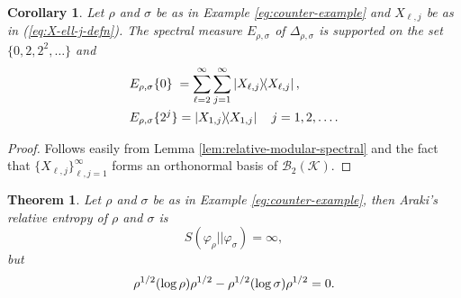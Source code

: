 \documentclass[12pt,a4paper,oneside]{article}
\numberwithin{equation}{section}
\theoremstyle{definition}  %
\theoremstyle{plain}  %
\newtheorem{thm}[defn]{Theorem}
\newtheorem{cor}[defn]{Corollary}
\theoremstyle{remark} %
\newcommand{\Bt}[1]{\mathscr{B}_2({#1})}
\newcommand{\CK}{\mathcal{K}}
\let\tr\relax
\DeclareMathOperator{\tr}{Tr}
\begin{document}
 \begin{cor} Let $\rho$ and $\sigma$ be as in Example \ref{eg:counter-example} and $X_{\ell,j}$ be as in (\ref{eq:X-ell-j-defn}).
The spectral measure $E_{\rho,\sigma}$ of $\Delta_{\rho,\sigma}$ is supported on the set $\{0,2,2^2,\dots\}$ and \begin{align}
    \label{eq:spectral-measure-relative-modular}
    &E_{\rho,\sigma}\{0\} \phantom{.}=\sum_{\ell=2}^\infty\sum_{j=1}^{\infty}\ketbra{X_{\ell,j}},\\
     &E_{\rho,\sigma}\{2^j\}  =\ketbra{X_{1,j}} \quad j=1,2,\dots.
\end{align}
 \end{cor}
 \begin{proof}
 Follows easily from  Lemma \ref{lem:relative-modular-spectral} and the fact that $\{X_{\ell,j}\}_{\ell, j=1}^{\infty}$ forms an orthonormal basis of  $\Bt{\CK }$. 
 \end{proof}
 \begin{thm}\label{thm:counter-example}
Let $\rho$ and $\sigma$ be as in Example \ref{eg:counter-example}, then Araki's relative entropy of $\rho$ and $\sigma$ is  \[S(\varphi_{\rho}||\varphi_\sigma) = \infty,\] but
\[\tr \rho^{1/2}(\log \rho) \rho^{1/2}-\tr\rho^{1/2}(\log \sigma)\rho^{1/2}=0.\]
 \end{thm}
\end{document}
